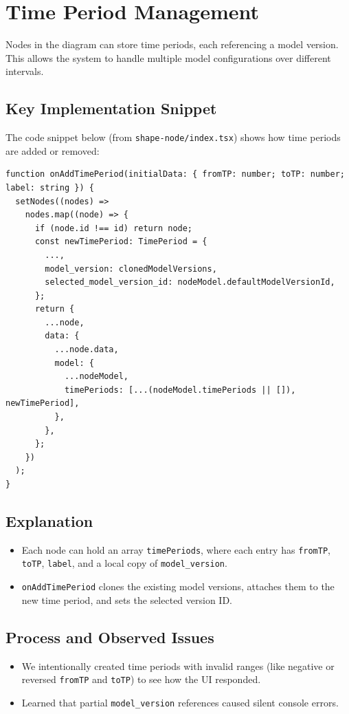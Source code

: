 \documentclass{article}
\begin{document}
\vspace{1em}
\section{Time Period Management}

Nodes in the diagram can store time periods, each referencing a model version. This allows the system to handle multiple model configurations over different intervals.

\subsection{Key Implementation Snippet}
The code snippet below (from \texttt{shape-node/index.tsx}) shows how time periods are added or removed:

\begin{verbatim}
function onAddTimePeriod(initialData: { fromTP: number; toTP: number; label: string }) {
  setNodes((nodes) =>
    nodes.map((node) => {
      if (node.id !== id) return node;
      const newTimePeriod: TimePeriod = {
        ...,
        model_version: clonedModelVersions,
        selected_model_version_id: nodeModel.defaultModelVersionId,
      };
      return {
        ...node,
        data: {
          ...node.data,
          model: {
            ...nodeModel,
            timePeriods: [...(nodeModel.timePeriods || []), newTimePeriod],
          },
        },
      };
    })
  );
}
\end{verbatim}

\subsection{Explanation}
\begin{itemize}
  \item Each node can hold an array \texttt{timePeriods}, where each entry has \texttt{fromTP}, \texttt{toTP}, \texttt{label}, and a local copy of \texttt{model\_version}.
  \item \texttt{onAddTimePeriod} clones the existing model versions, attaches them to the new time period, and sets the selected version ID.
\end{itemize}

\subsection{Process and Observed Issues}
\begin{itemize}
  \item We intentionally created time periods with invalid ranges (like negative or reversed \texttt{fromTP} and \texttt{toTP}) to see how the UI responded.
  \item Learned that partial \texttt{model\_version} references caused silent console errors.
\end{itemize}
\end{document}
